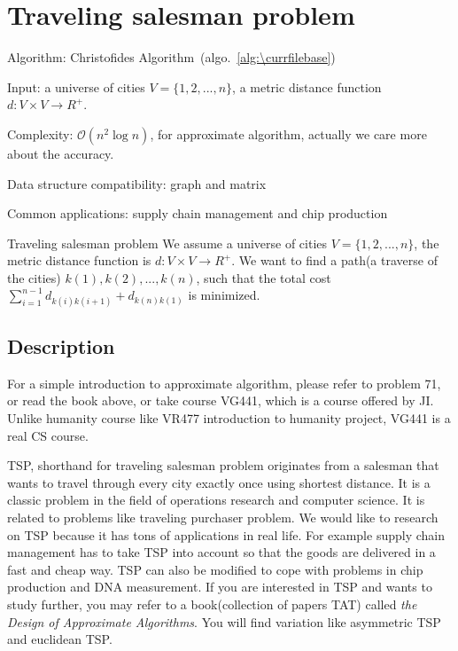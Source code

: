 \documentclass[catalog.tex]{subfiles}
\begin{document}
\def\pbname{Traveling salesman problem} %

\section{\pbname} 

\begin{overview}
\item [Algorithm:] Christofides Algorithm~(algo.~\ref{alg:\currfilebase}) 
\item [Input:] a universe of cities $V = \{1, 2, ..., n\}$, a metric distance function $d: V \times V \to R^+$.
\item [Complexity:] $\mathcal{O}(n^2 \log n)$, for approximate algorithm, actually we care more about the accuracy.
\item [Data structure compatibility:] graph and matrix
\item [Common applications:] supply chain management and chip production
\end{overview}


\begin{problem}{\pbname}
	We assume a universe of cities $V = \{1, 2, ..., n\}$, the metric distance function is $d: V \times V \to R^+$. We want to find a path(a traverse of the cities) $k(1), k(2), ..., k(n)$, such that the total cost $\sum_{i=1}^{n-1}d_{k(i)k(i+1)} + d_{k(n)k(1)}$ is minimized.
\end{problem}

\subsection*{Description}
For a simple introduction to approximate algorithm, please refer to problem 71, or read the book above, or take course VG441, which is a course offered by JI. Unlike humanity course like VR477 introduction to humanity project, VG441 is a real CS course.\newline

TSP, shorthand for traveling salesman problem originates from a salesman that wants to travel through every city exactly once using shortest distance. It is a classic problem in the field of operations research and computer science. It is related to problems like traveling purchaser problem. We would like to research on TSP because it has tons of applications in real life. For example supply chain management has to take TSP into account so that the goods are delivered in a fast and cheap way. TSP can also be modified to cope with problems in chip production and DNA measurement. If you are interested in TSP and wants to study further, you may refer to a book(collection of papers TAT) called \emph{the Design of Approximate Algorithms}\cite{williamson2011design}. You will find variation like asymmetric TSP and euclidean TSP.
\newline
\end{document}
